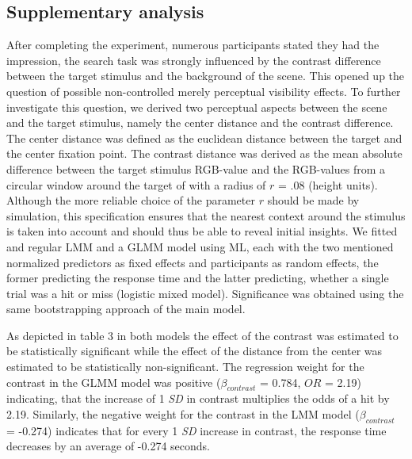 \documentclass[
  man,floatsintext]{apa7}
\begin{document}
\newpage

\newpage

\hypertarget{supplementary-analysis}{%
\subsection{Supplementary analysis}\label{supplementary-analysis}}

After completing the experiment, numerous participants stated they had the impression, the search task was strongly influenced by the contrast difference between the target stimulus and the background of the scene. This opened up the question of possible non-controlled merely perceptual visibility effects. To further investigate this question, we derived two perceptual aspects between the scene and the target stimulus, namely the center distance and the contrast difference. The center distance was defined as the euclidean distance between the target and the center fixation point. The contrast distance was derived as the mean absolute difference between the target stimulus RGB-value and the RGB-values from a circular window around the target of with a radius of \(r\) = .08 (height units). Although the more reliable choice of the parameter \(r\) should be made by simulation, this specification ensures that the nearest context around the stimulus is taken into account and should thus be able to reveal initial insights. We fitted and regular LMM and a GLMM model using ML, each with the two mentioned normalized predictors as fixed effects and participants as random effects, the former predicting the response time and the latter predicting, whether a single trial was a hit or miss (logistic mixed model). Significance was obtained using the same bootstrapping approach of the main model.

As depicted in table 3 in both models the effect of the contrast was estimated to be statistically significant while the effect of the distance from the center was estimated to be statistically non-significant. The regression weight for the contrast in the GLMM model was positive (\(\beta_{contrast}\) = 0.784, \(OR\) = 2.19) indicating, that the increase of 1 \emph{SD} in contrast multiplies the odds of a hit by 2.19. Similarly, the negative weight for the contrast in the LMM model (\(\beta_{contrast}\) = -0.274) indicates that for every 1 \emph{SD} increase in contrast, the response time decreases by an average of -0.274 seconds.

\newpage
\end{document}

